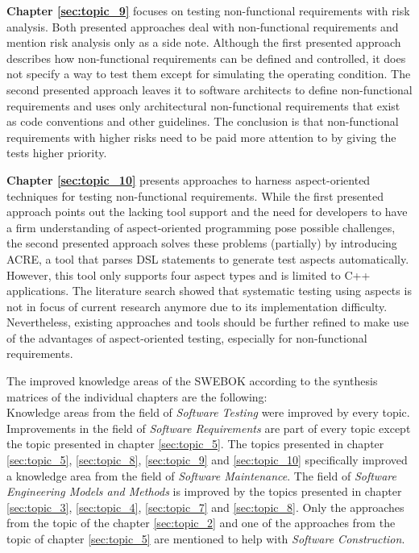 \textbf{Chapter \ref{sec:topic_9}} focuses on testing non-functional requirements with risk analysis. Both presented approaches deal with non-functional requirements and mention risk analysis only as a side note. Although the first presented approach \cite{ZouPavlovski2008} describes how non-functional requirements can be defined and controlled, it does not specify a way to test them except for simulating the operating condition. The second presented approach \cite{Lagerstedt2014} leaves it to software architects to define non-functional requirements and uses only architectural non-functional requirements that exist as code conventions and other guidelines. The conclusion is that non-functional requirements with higher risks need to be paid more attention to by giving the tests higher priority.

\textbf{Chapter \ref{sec:topic_10}} presents approaches to harness aspect-oriented techniques for testing non-functional requirements. While the first presented approach \cite{Metsa} points out the lacking tool support and the need for developers to have a firm understanding of aspect-oriented programming pose possible challenges, the second presented approach \cite{Duclos} solves these problems (partially) by introducing ACRE, a tool that parses DSL statements to generate test aspects automatically. However, this tool only supports four aspect types and is limited to C++ applications. The literature search showed that systematic testing using aspects is not in focus of current research anymore due to its implementation difficulty. Nevertheless, existing approaches and tools should be further refined to make use of the advantages of aspect-oriented testing, especially for non-functional requirements. 

The improved knowledge areas of the SWEBOK according to the synthesis matrices of the individual chapters are the following:\\
Knowledge areas from the field of \textit{Software Testing} were improved by every topic. Improvements in the field of \textit{Software Requirements} are part of every topic except the topic presented in chapter \ref{sec:topic_5}. The topics presented in chapter \ref{sec:topic_5}, \ref{sec:topic_8}, \ref{sec:topic_9} and \ref{sec:topic_10} specifically improved a knowledge area from the field of \textit{Software Maintenance}. The field of \textit{Software Engineering Models and Methods} is improved by the topics presented in chapter \ref{sec:topic_3}, \ref{sec:topic_4}, \ref{sec:topic_7} and \ref{sec:topic_8}. Only the approaches from the topic of the chapter \ref{sec:topic_2} and one of the approaches from the topic of chapter \ref{sec:topic_5} are mentioned to help with \textit{Software Construction}.

